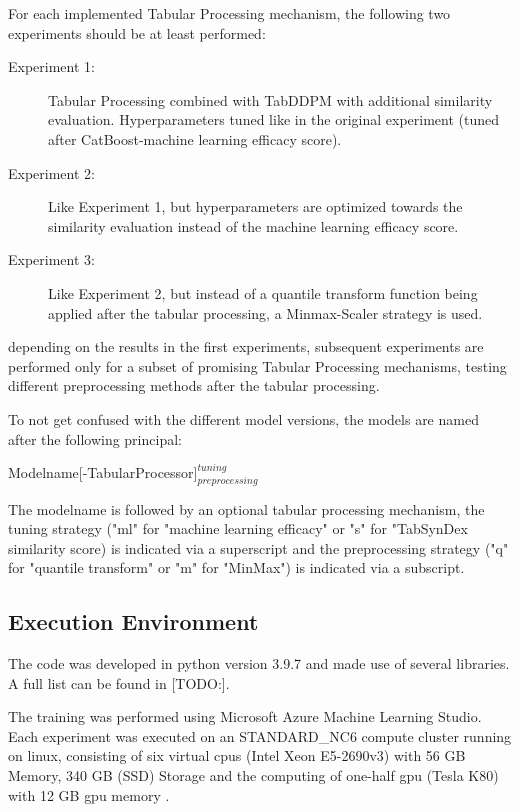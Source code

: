 For each implemented Tabular Processing mechanism, the following two experiments should be at least performed:

\begin{description}
    \item[Experiment 1:] Tabular Processing combined with TabDDPM with additional similarity evaluation. Hyperparameters tuned like in the original experiment (tuned after CatBoost-machine learning efficacy score).
    \item[Experiment 2:] Like Experiment 1, but hyperparameters are optimized towards the similarity evaluation instead of the machine learning efficacy score.
    \item[Experiment 3:] Like Experiment 2, but instead of a quantile transform function being applied after the tabular processing, a Minmax-Scaler strategy is used.
\end{description}

depending on the results in the first experiments, subsequent experiments are performed only for a subset of promising Tabular Processing mechanisms, \eg testing different preprocessing methods after the tabular processing.

To not get confused with the different model versions, the models are named after the following principal:

Modelname[-TabularProcessor]$^{tuning}_{preprocessing}$

The modelname is followed by an optional tabular processing mechanism, the tuning strategy ("ml" for "machine learning efficacy" or "s" for "TabSynDex similarity score) is indicated via a superscript and the preprocessing strategy ("q" for "quantile transform" or "m" for "MinMax")  is indicated via a subscript.

\subsection{Execution Environment}
\label{ch:environment}


The code was developed in python version 3.9.7 and made use of several libraries.
A full list can be found in [TODO:].

The training was performed using Microsoft Azure Machine Learning Studio.
Each experiment was executed on an STANDARD\_NC6 compute cluster running on linux, consisting of six virtual \glspl{cpu} (Intel Xeon E5-2690v3) with 56 GB Memory, 340 GB (SSD) Storage and the computing of one-half \gls{gpu} (Tesla K80) with 12 GB \gls{gpu} memory \cite{vikancha-msft2022NCseriesAzureVirtual}.

